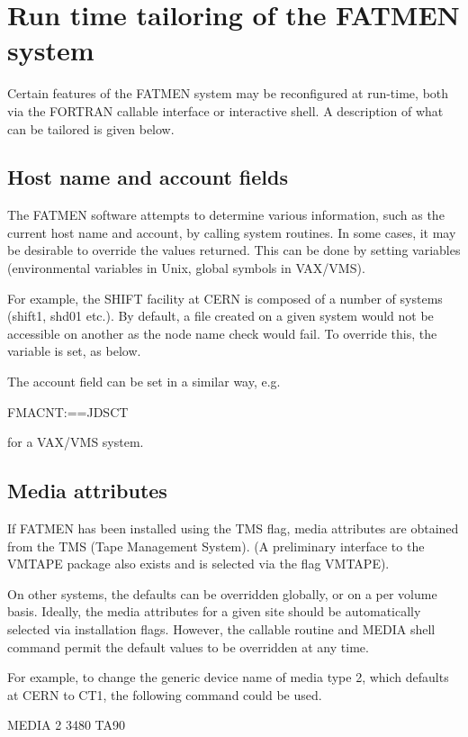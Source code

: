 \section{Run time tailoring of the FATMEN system}

Certain features of the FATMEN system may be reconfigured at run-time,
both via the FORTRAN callable interface or interactive shell.
A description of what can be tailored is given below.
\subsection{Host name and account fields}

The FATMEN software attempts to determine various information, such as the
current host name and account, by calling system routines. In some cases, 
it may be desirable to override the values returned. This can be done by
setting variables (environmental variables in Unix, global symbols in VAX/VMS). 

For example, the SHIFT facility at CERN is composed of a number of systems
(shift1, shd01 etc.). By default, a file created on a given system
would not be accessible on another as the node name check would fail. 
To override this, the variable  is set, 
as below.
\begin{XMP}
\end{XMP}

The account field can be set in a similar way, e.g.
\begin{XMP}
FMACNT:==JDSCT
\end{XMP}
for a VAX/VMS system.
\subsection{Media attributes}
\par
If FATMEN has been installed using the TMS flag, media attributes are obtained
from the TMS (Tape Management System). (A preliminary interface to the VMTAPE
package also exists and is selected via the flag VMTAPE).
\par
On other systems, the defaults can be overridden globally, or on a per volume basis.
Ideally, the media attributes for a given site should be automatically selected
via installation flags. However, the  callable routine and MEDIA shell command
permit the default values to be overridden at any time.
\par
For example, to change the generic device name of media type 2, which defaults
at CERN to CT1, the following command could be used.
\begin{XMP}
MEDIA 2 3480 TA90
\end{XMP}
